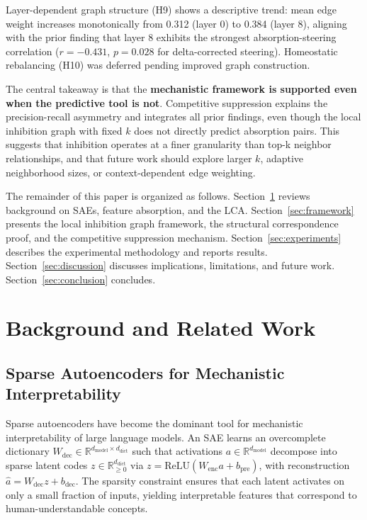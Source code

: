 \documentclass{article}
\begin{document}
Layer-dependent graph structure (H9) shows a descriptive trend: mean edge weight increases monotonically from 0.312 (layer 0) to 0.384 (layer 8), aligning with the prior finding that layer 8 exhibits the strongest absorption-steering correlation ($r = -0.431$, $p = 0.028$ for delta-corrected steering). Homeostatic rebalancing (H10) was deferred pending improved graph construction.

The central takeaway is that the \textbf{mechanistic framework is supported even when the predictive tool is not}. Competitive suppression explains the precision-recall asymmetry and integrates all prior findings, even though the local inhibition graph with fixed $k$ does not directly predict absorption pairs. This suggests that inhibition operates at a finer granularity than top-k neighbor relationships, and that future work should explore larger $k$, adaptive neighborhood sizes, or context-dependent edge weighting.

The remainder of this paper is organized as follows. Section~\ref{sec:background} reviews background on SAEs, feature absorption, and the LCA. Section~\ref{sec:framework} presents the local inhibition graph framework, the structural correspondence proof, and the competitive suppression mechanism. Section~\ref{sec:experiments} describes the experimental methodology and reports results. Section~\ref{sec:discussion} discusses implications, limitations, and future work. Section~\ref{sec:conclusion} concludes.

\section{Background and Related Work}
\label{sec:background}

\subsection{Sparse Autoencoders for Mechanistic Interpretability}

Sparse autoencoders have become the dominant tool for mechanistic interpretability of large language models. An SAE learns an overcomplete dictionary $W_{\text{dec}} \in \mathbb{R}^{d_{\text{model}} \times d_{\text{dict}}}$ such that activations $a \in \mathbb{R}^{d_{\text{model}}}$ decompose into sparse latent codes $z \in \mathbb{R}^{d_{\text{dict}}}_{\geq 0}$ via $z = \text{ReLU}(W_{\text{enc}} a + b_{\text{pre}})$, with reconstruction $\hat{a} = W_{\text{dec}} z + b_{\text{dec}}$. The sparsity constraint ensures that each latent activates on only a small fraction of inputs, yielding interpretable features that correspond to human-understandable concepts.
\end{document}
